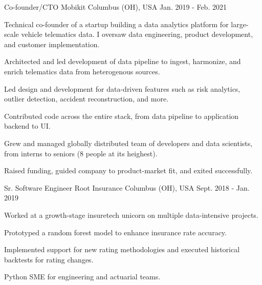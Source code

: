 \begin{cventries}
  \cventry
    {Co-founder/CTO} %
    {Mobikit} %
    {Columbus (OH), USA} %
    {Jan. 2019 - Feb. 2021} %
    {
      Technical co-founder of a startup building a data analytics platform for large-scale vehicle telematics data. I oversaw data engineering, product development, and customer implementation.
      \vspace{5.0mm}
      \begin{cvitems} %
        \item {Architected and led development of data pipeline to ingest, harmonize, and enrich telematics data from heterogenous sources.}
        \item {Led design and development for data-driven features such as risk analytics, outlier detection, accident reconstruction, and more.}
        \item {Contributed code across the entire stack, from data pipeline to application backend to UI.}
        \item {Grew and managed globally distributed team of developers and data scientists, from interns to seniors (8 people at its heighest).}
        \item {Raised funding, guided company to product-market fit, and exited successfully.}
      \end{cvitems}
    }

  \cventry
    {Sr. Software Engineer} %
    {Root Insurance} %
    {Columbus (OH), USA} %
    {Sept. 2018 - Jan. 2019} %
    {
      Worked at a growth-stage insuretech unicorn on multiple data-intensive projects.
      \vspace{5.0mm}
      \begin{cvitems} %
        \item {Prototyped a random forest model to enhance insurance rate accuracy.}
        \item {Implemented support for new rating methodologies and executed historical backtests for rating changes.}
        \item {Python SME for engineering and actuarial teams.}
      \end{cvitems}
    }


\end{cventries}
